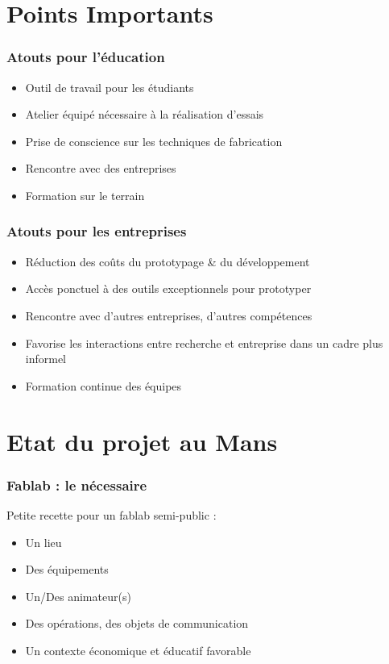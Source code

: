 \documentclass[10pt, compress]{beamer}
\begin{document}
	\section{Points Importants}

	\begin{frame}
		\frametitle{Atouts pour l'éducation}

		\begin{itemize}
			\item \alert{Outil de travail} pour les étudiants
			\item Atelier équipé nécessaire à la \alert{réalisation d'essais}
			\item Prise de conscience sur les \alert{techniques de fabrication}
			\item \alert{Rencontre} avec des entreprises
			\item \alert{Formation} sur le terrain
		\end{itemize}
	\end{frame}

	\begin{frame}
		\frametitle{Atouts pour les entreprises}

		\begin{itemize}
			\item \alert{Réduction des coûts} du prototypage \& du développement
			\item Accès ponctuel à des outils exceptionnels pour \alert{prototyper}
			\item Rencontre avec d'autres entreprises, d'\alert{autres compétences}
			\item Favorise les interactions entre recherche et entreprise dans un cadre plus informel
			\item \alert{Formation continue} des équipes
		\end{itemize}
	\end{frame}

	\section{Etat du projet au Mans}

	\begin{frame}
		\frametitle{Fablab : le nécessaire}

		Petite recette pour un fablab semi-public :

		\pause

		\begin{itemize}[<+->]
			\item Un \alert{lieu}
			\item Des \alert{équipements}
			\item Un/Des animateur(s)
			\item Des opérations, des objets de \alert{communication}
			\item Un \alert{contexte} économique et éducatif \alert{favorable}
		\end{itemize}
	\end{frame}
\end{document}
